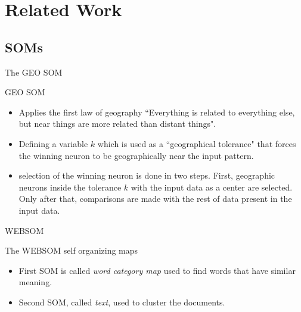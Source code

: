 \section{Related Work}
\subsection{SOMs}
\begin{frame}{The GEO SOM}
  \begin{block}{GEO SOM}
    \begin{itemize}
      \item Applies the first law of geography “Everything is related to everything else, but near things are more related than distant things".
      \item  Defining a variable $k$ which is used as a ``geographical tolerance" that forces the winning neuron to be geographically near the input pattern.
      \item selection of the winning neuron is done in two steps. First, geographic neurons inside the tolerance $k$ with the input data as a center are selected. Only after that, comparisons are made with the rest of data present in the input data.
    \end{itemize}
  \end{block}
\end{frame}

\begin{frame}{WEBSOM}
  \begin{block}{The WEBSOM self organizing maps}
    \begin{itemize}
      \item  First SOM is called \textit{word category map}  used to find words that have similar meaning.
      \item Second SOM, called \textit{text},  used to cluster the documents.
    \end{itemize}
  \end{block}
\end{frame}

